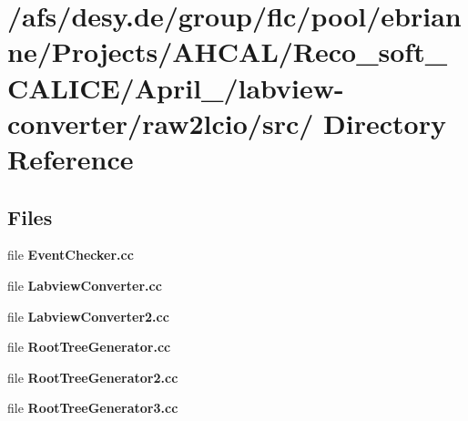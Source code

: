 \section{/afs/desy.de/group/flc/pool/ebrianne/Projects/AHCAL/Reco\_\-soft\_\-CALICE/April\_/labview-converter/raw2lcio/src/ Directory Reference}
\label{dir_aa2bd2dcedb92e13981c58919c4e6440}
\subsection*{Files}
\begin{CompactItemize}
\item 
file \textbf{Event\-Checker.cc}
\item 
file \textbf{Labview\-Converter.cc}
\item 
file \textbf{Labview\-Converter2.cc}
\item 
file \textbf{Root\-Tree\-Generator.cc}
\item 
file \textbf{Root\-Tree\-Generator2.cc}
\item 
file \textbf{Root\-Tree\-Generator3.cc}
\end{CompactItemize}
